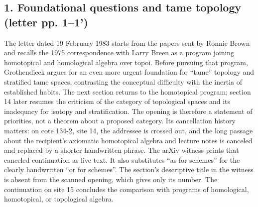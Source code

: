 \documentclass[10pt,oneside]{book}
\begin{document}
\subsection*{1. Foundational questions and tame topology (letter pp. 1--1')}
The letter dated 19 February 1983 starts from the papers sent by Ronnie Brown and recalls the 1975 correspondence with Larry Breen as a program joining homotopical and homological algebra over topoi. Before pursuing that program, Grothendieck argues for an even more urgent foundation for ``tame'' topology and stratified tame spaces, contrasting the conceptual difficulty with the inertia of established habits. The next section returns to the homotopical program; section 14 later resumes the criticism of the category of topological spaces and its inadequacy for isotopy and stratification. The opening is therefore a statement of priorities, not a theorem about a proposed category. Its cancellation history matters: on cote 134-2, site 14, the addressee is crossed out, and the long passage about the recipient's axiomatic homotopical algebra and lecture notes is canceled and replaced by a shorter handwritten phrase. The arXiv witness prints that canceled continuation as live text. It also substitutes ``as for schemes'' for the clearly handwritten ``or for schemes''. The section's descriptive title in the witness is absent from the scanned opening, which gives only its number. The continuation on site 15 concludes the comparison with programs of homological, homotopical, or topological algebra.
\end{document}
